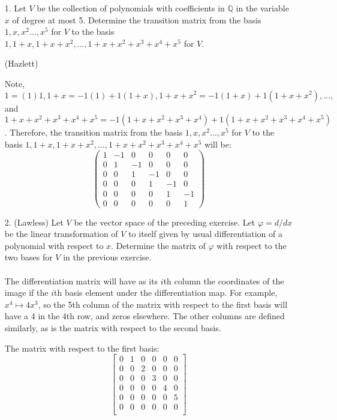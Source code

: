 \documentclass[10pt]{article}
\newcommand{\Q}{\mathbb{Q}}
\renewcommand{\phi}{\varphi}
\begin{document}
\begin{itemize}

\item[1.] Let $V$ be the collection of polynomials with coefficients in $\Q$ in the variable $x$ of degree at most 5.  Determine the transition matrix from the basis $1,x,x^2\ldots, x^5$ for $V$ to the basis $1,1+x,1+x+x^2, \ldots, 1+x+x^2+x^3+x^4+x^5$ for $V$.

(Hazlett) 

Note, $1 = (1)1, 1+x =-1(1)+1(1+x), 1+x+x^2 = -1(1+x) + 1(1+x+x^2), \ldots,$ and $1+x+x^2+x^3+x^4+x^5 = -1(1+x+x^2+x^3+x^4) + 1(1+x+x^2+x^3+x^4+x^5)$.  Therefore, the transition matrix from the basis $1,x,x^2\ldots, x^5$ for $V$ to the basis $1,1+x,1+x+x^2, \ldots, 1+x+x^2+x^3+x^4+x^5$ will be:
$$\left(
\begin{matrix}
1&-1&0&0&0&0\\
0&1&-1&0&0&0\\
0&0&1&-1&0&0\\
0&0&0&1&-1&0\\
0&0&0&0&1&-1\\
0&0&0&0&0&1
\end{matrix}
\right)$$

\item[2.] (Lawless) Let $V$ be the vector space of the preceding exercise.  Let $\phi = d/dx$ be the linear transformation of $V$ to itself given by usual differentiation of a polynomial with respect to $x$.  Determine the matrix of $\phi$ with respect to the two bases for $V$ in the previous exercise. 
\\
\\
The differentiation matrix will have as its $i$th column the coordinates of the image if the $i$th basis element under the differentiation map. For example, $x^4 \mapsto 4x^3$, so the 5th column of the matrix with respect to the first basis will have a 4 in the 4th row, and zeros elsewhere. The other columns are defined similarly, as is the matrix with respect to the second basis. 


The matrix with respect to the first basis:
\begin{equation*} 
\left[
\begin{matrix}
0 & 1 & 0 & 0 & 0 & 0  \\
0 & 0 & 2 & 0 & 0 & 0  \\
0 & 0 & 0 & 3 & 0 & 0  \\
0 & 0 & 0 & 0 & 4 & 0  \\
0 & 0 & 0 & 0 & 0 & 5  \\
0 & 0 & 0 & 0 & 0 & 0  \\
\end{matrix}
\right]
\end{equation*}


\end{itemize}
\end{document}
